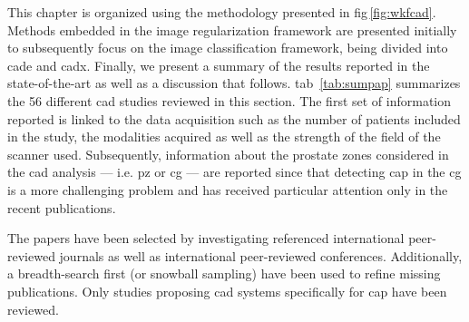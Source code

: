 


This chapter is organized using the methodology presented in \acs{fig}\,\ref{fig:wkfcad}.
Methods embedded in the image regularization framework are presented initially to subsequently focus on the image classification framework, being divided into \ac{cade} and \ac{cadx}.
Finally, we present a summary of the results reported in the state-of-the-art as well as a discussion that follows.
\Acl{tab}~\ref{tab:sumpap} summarizes the 56 different \ac{cad} studies reviewed in this section.
The first set of information reported is linked to the data acquisition such as the number of patients included in the study, the modalities acquired as well as the strength of the field of the scanner used.
Subsequently, information about the prostate zones considered in the \ac{cad} analysis --- i.e. \ac{pz} or \ac{cg} --- are reported since that detecting \ac{cap} in the \ac{cg} is a more challenging problem and has received particular attention only in the recent publications.

The papers have been selected by investigating referenced international peer-reviewed journals as well as international peer-reviewed conferences.
Additionally, a breadth-search first (or snowball sampling) have been used to refine missing publications.
Only studies proposing \ac{cad} systems specifically for \ac{cap} have been reviewed.






